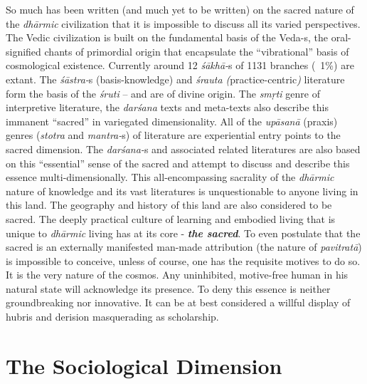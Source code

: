 So much has been written (and much yet to be written) on the sacred nature of the \textit{dhārmic} civilization that it is impossible to discuss all its varied perspectives. The Vedic civilization is built on the fundamental basis of the Veda-s, the oral-signified chants of primordial origin that encapsulate the “vibrational” basis of cosmological existence. Currently around 12 \textit{śākhā-}s of 1131 branches (~1\%) are extant. The \textit{śāstra-}s (basis-knowledge) and \textit{śrauta (}practice-centric\textit{)} literature form the basis of the \textit{śruti} – and are of divine origin. The \textit{smṛti} genre of interpretive literature, the \textit{darśana} texts and meta-texts also describe this immanent “sacred” in variegated dimensionality. All of the \textit{upāsanā} (praxis) genres (\textit{stotra} and \textit{mantra-}s) of literature are experiential entry points to the sacred dimension. The \textit{darśana-}s and associated related literatures are also based on this “essential” sense of the sacred and attempt to discuss and describe this essence multi-dimensionally. This all-encompassing sacrality of the \textit{dhārmic} nature of knowledge and its vast literatures is unquestionable to anyone living in this land. The geography and history of this land are also considered to be sacred. The deeply practical culture of learning and embodied living that is unique to \textit{dhārmic} living has at its core - \textbf{\textit{the sacred}}. To even postulate that the sacred is an externally manifested man-made attribution (the nature of \textit{pavitratā}) is impossible to conceive, unless of course, one has the requisite motives to do so. It is the very nature of the cosmos. Any uninhibited, motive-free human in his natural state will acknowledge its presence. To deny this essence is neither groundbreaking nor innovative. It can be at best considered a willful display of hubris and derision masquerading as scholarship.


\section*{The Sociological Dimension}

